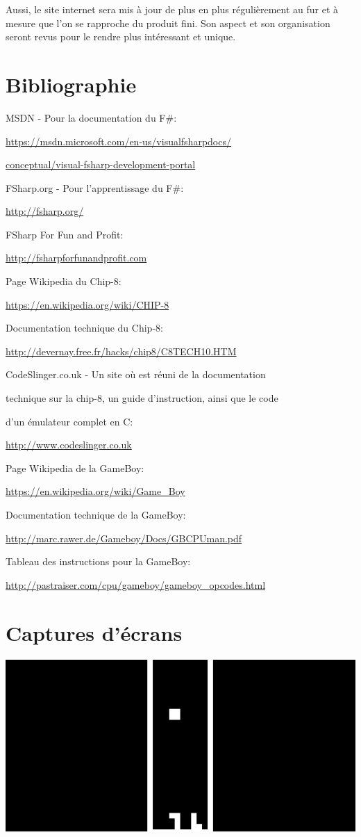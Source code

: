 \documentclass[12pt, a4paper]{article}
\begin{document}
Aussi, le site internet sera mis à jour de plus en plus régulièrement au fur et à mesure que l'on se rapproche du produit fini. Son aspect et son organisation seront revus pour le rendre plus intéressant et unique.

\pagebreak

\section{Bibliographie}
MSDN - Pour la documentation du F\#:

\url{https://msdn.microsoft.com/en-us/visualfsharpdocs/}

\url{conceptual/visual-fsharp-development-portal}

\bigskip
FSharp.org - Pour l'apprentissage du F\#:

\url{http://fsharp.org/}

\bigskip
FSharp For Fun and Profit:

\url{http://fsharpforfunandprofit.com}

\bigskip
Page Wikipedia du Chip-8:  

\url{https://en.wikipedia.org/wiki/CHIP-8}

\bigskip
Documentation technique du Chip-8:  

\url{http://devernay.free.fr/hacks/chip8/C8TECH10.HTM}

\bigskip
CodeSlinger.co.uk - Un site où est réuni de la documentation

technique sur la chip-8, un guide d'instruction, ainsi que le code

d'un émulateur complet en C:

\url{http://www.codeslinger.co.uk}

\bigskip

Page Wikipedia de la GameBoy:

\url{https://en.wikipedia.org/wiki/Game_Boy}

\bigskip

Documentation technique de la GameBoy:

\url{http://marc.rawer.de/Gameboy/Docs/GBCPUman.pdf}

\bigskip
Tableau des instructions pour la GameBoy:

\url{http://pastraiser.com/cpu/gameboy/gameboy\_opcodes.html}

\pagebreak
\section{Captures d'écrans}
\includegraphics[width=14cm]{chip8cap4.PNG}
\end{document}
